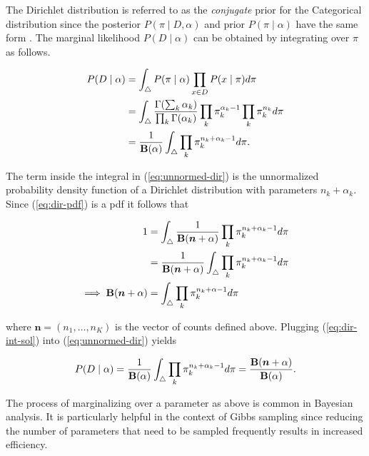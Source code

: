 \documentclass[12pt]{report}
\newcommand{\1}[0]{\mathbbm{1}}
\newcommand{\Bf}[0]{\text{\textbf{B}}}
\begin{document}
The Dirichlet distribution is referred to as the \emph{conjugate} prior for the 
Categorical distribution since the posterior $P(\pi \mid D, \alpha)$ and prior $P(\pi \mid \alpha)$ 
have the same form \cite{gelman-bayesian-data-analysis}. The marginal likelihood $P(D \mid \alpha)$ 
can be obtained by integrating over $\pi$ as follows.

\begin{align}
    P(D \mid \alpha) 
    &= \int_{\triangle} P(\pi \mid \alpha)\prod_{x \in D} P(x \mid \pi) d \pi \nonumber \\
    &= \int_{\triangle} \frac{\Gamma(\sum_k \alpha_k)}{\prod_k \Gamma(\alpha_k)}
                        \prod_k \pi^{\alpha_k - 1}_k \prod_k \pi_k^{n_k} d \pi \nonumber \\
    &= \frac{1}{\Bf(\alpha)}
       \int_{\triangle} \prod_k \pi_k^{n_k + \alpha_k - 1} d \pi. \label{eq:unnormed-dir}
\end{align}

The term inside the integral in (\ref{eq:unnormed-dir}) is the unnormalized probability density function
of a Dirichlet distribution with parameters $n_k + \alpha_k$. Since (\ref{eq:dir-pdf})
is a pdf it follows that

\begin{align}
    1 
    &= \int_\triangle \frac{1}{\Bf(\bm{n} + \alpha)} \prod_k \pi_k^{n_k + \alpha_k - 1} d \pi \nonumber \\
    &= \frac{1}{\Bf(\bm{n} + \alpha)} \int_\triangle \prod_k \pi_k^{n_k + \alpha_k - 1} d \pi \nonumber  \\
\implies \Bf(\bm{n} + \alpha) &= \int_\triangle \prod_k \pi_k^{n_k + \alpha - 1} d \pi \label{eq:dir-int-sol}
\end{align}

where $\bm{n} = (n_1, \ldots, n_K)$ is the vector of counts defined above.
Plugging (\ref{eq:dir-int-sol}) into (\ref{eq:unnormed-dir}) yields

\begin{equation}
    P(D \mid \alpha) 
    = \frac{1}{\Bf(\alpha)}\int_{\triangle} \prod_k \pi_k^{n_k + \alpha_k - 1} d \pi
    = \frac{\Bf(\bm{n} + \alpha)}{\Bf(\alpha)}. \label{eq:dpcmarg}
\end{equation}

The process of marginalizing over a parameter as above is common in Bayesian analysis. 
It is particularly helpful in the context of Gibbs sampling since reducing the number
of parameters that need to be sampled frequently results in increased efficiency.
\end{document}
